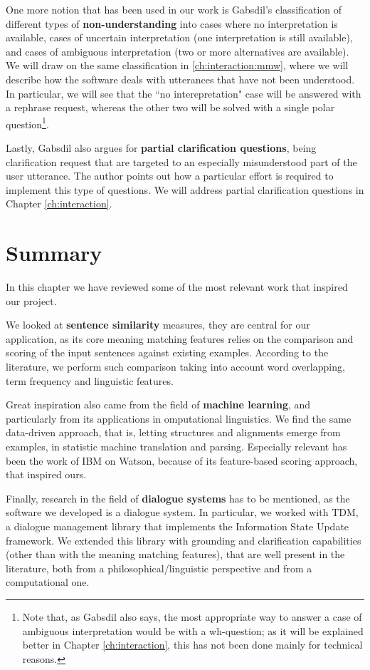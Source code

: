 One more notion that has been used in our work is Gabsdil's classification of different types of \textbf{non-understanding} into cases where no interpretation is available, cases of uncertain interpretation (one interpretation is still available), and cases of ambiguous interpretation (two or more alternatives are available). We will draw on the same classification in \ref{ch:interaction:mmw}, where we will describe how the software deals with utterances that have not been understood. In particular, we will see that the ``no interepretation" case will be answered with a rephrase request, whereas the other two will be solved with a single polar question\footnote{Note that, as Gabsdil also says, the most appropriate way to answer a case of ambiguous interpretation would be with a wh-question; as it will be explained better in Chapter \ref{ch:interaction}, this has not been done mainly for technical reasons.}.

Lastly, Gabsdil also argues for \textbf{partial clarification questions}, being clarification request that are targeted to an especially misunderstood part of the user utterance. The author points out how a particular effort is required to implement this type of questions. We will address partial clarification questions in Chapter \ref{ch:interaction}.

\section{Summary}
In this chapter we have reviewed some of the most relevant work that inspired our project.

We looked at \textbf{sentence similarity} measures, they are central for our application, as its core meaning matching features relies on the comparison and scoring of the input sentences against existing examples. According to the literature, we perform such comparison taking into account word overlapping, term frequency and linguistic features.

Great inspiration also came from the field of \textbf{machine learning}, and particularly from its applications in omputational linguistics. We find the same data-driven approach, that is, letting structures and alignments emerge from examples, in statistic machine translation and parsing. Especially relevant has been the work of IBM on Watson, because of its feature-based scoring approach, that inspired ours.

Finally, research in the field of \textbf{dialogue systems} has to be mentioned, as the software we developed is a dialogue system. In particular, we worked with TDM, a dialogue management library that implements the Information State Update framework. We extended this library with grounding and clarification capabilities (other than with the meaning matching features), that are well present in the literature, both from a philosophical/linguistic perspective and from a computational one.